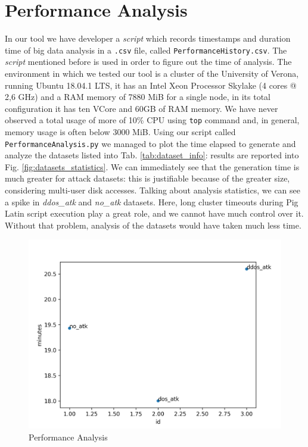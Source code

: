 \section{Performance Analysis}
\label{sec:perfanalysis}
In our tool we have developer a \textit{script} which records timestamps and duration time of big data analysis in a \texttt{.csv} file, called \texttt{PerformanceHistory.csv}. The \textit{script} mentioned before is used in order to figure out the time of analysis. 
The environment in which we tested our tool is a cluster of the University of Verona, running Ubuntu 18.04.1 LTS, it has an Intel Xeon Processor Skylake (4 cores @ 2,6 GHz) and a RAM memory of 7880 MiB for a single node, in its total configuration it has ten VCore and 60GB of RAM memory. 
We have never observed a total usage of more of 10\% CPU using \texttt{top} command and, in general, memory usage is often below 3000 MiB.
Using our script called \texttt{PerformanceAnalysis.py} we managed to plot the time elapsed to generate and analyze the datasets listed into Tab. \ref{tab:dataset_info}: results are reported into Fig. \ref{fig:datasets_statistics}.
We can immediately see that the generation time is much greater for attack datasets: this is justifiable because of the greater size, considering multi-user disk accesses.
Talking about analysis statistics, we can see a spike in \textit{ddos\_atk} and \textit{no\_atk} datasets. Here, long cluster timeouts during Pig Latin script execution play a great role, and we cannot have much control over it. Without that problem, analysis of the datasets would have taken much less time.

\begin{figure}[ht]
	\centering
	\includegraphics[scale=0.49]{imgs/analysis_stat.png}
	\caption{Performance Analysis} 
	\label{fig:analysis_stats}
\end{figure}

